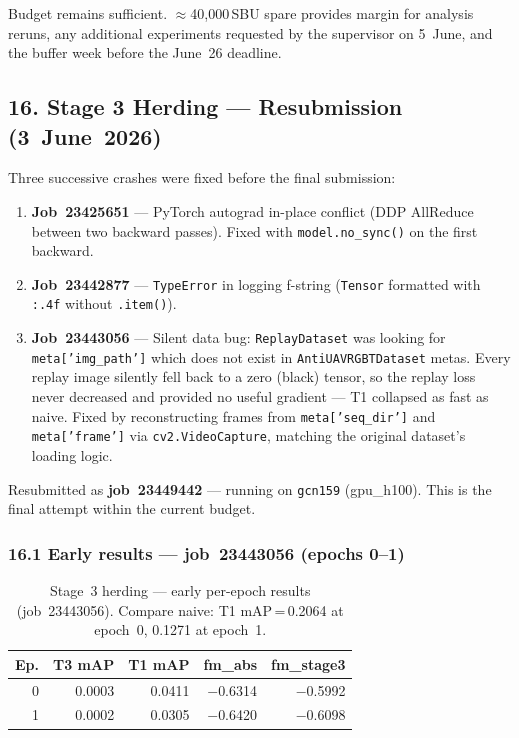 \noindent Budget remains sufficient. $\approx$40,000\,SBU spare provides
margin for analysis reruns, any additional experiments requested by the
supervisor on 5~June, and the buffer week before the June~26 deadline.

\subsection*{16. Stage 3 Herding — Resubmission (3~June~2026)}

Three successive crashes were fixed before the final submission:

\begin{enumerate}
    \item \textbf{Job~23425651} — PyTorch autograd in-place conflict (DDP
    AllReduce between two backward passes). Fixed with \texttt{model.no\_sync()}
    on the first backward.
    \item \textbf{Job~23442877} — \texttt{TypeError} in logging f-string
    (\texttt{Tensor} formatted with \texttt{:.4f} without \texttt{.item()}).
    \item \textbf{Job~23443056} — Silent data bug: \texttt{ReplayDataset}
    was looking for \texttt{meta['img\_path']} which does not exist in
    \texttt{AntiUAVRGBTDataset} metas. Every replay image silently fell back
    to a zero (black) tensor, so the replay loss never decreased and provided
    no useful gradient — T1 collapsed as fast as naive. Fixed by reconstructing
    frames from \texttt{meta['seq\_dir']} and \texttt{meta['frame']} via
    \texttt{cv2.VideoCapture}, matching the original dataset's loading logic.
\end{enumerate}

\noindent Resubmitted as \textbf{job~23449442} — running on \texttt{gcn159}
(gpu\_h100). This is the final attempt within the current budget.

\subsubsection*{16.1 Early results — job~23443056 (epochs 0--1)}

\begin{table}[h]
\centering
\caption{Stage~3 herding — early per-epoch results (job~23443056).
Compare naive: T1 mAP\,=\,0.2064 at epoch~0, 0.1271 at epoch~1.}
\label{tab:s3_herding_early}
\small
\begin{tabular}{rrrrr}
\hline
\textbf{Ep.} & \textbf{T3 mAP} & \textbf{T1 mAP} & \textbf{fm\_abs} & \textbf{fm\_stage3} \\
\hline
0 & 0.0003 & 0.0411 & $-$0.6314 & $-$0.5992 \\
1 & 0.0002 & 0.0305 & $-$0.6420 & $-$0.6098 \\
\hline
\end{tabular}
\end{table}


